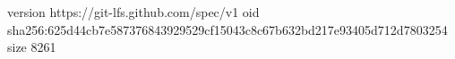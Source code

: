 version https://git-lfs.github.com/spec/v1
oid sha256:625d44cb7e587376843929529cf15043c8c67b632bd217e93405d712d7803254
size 8261
